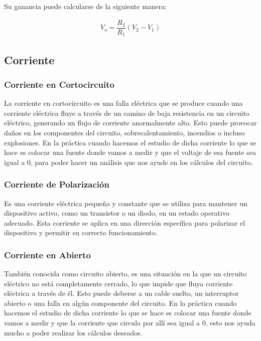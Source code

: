             Su ganancia puede calcularse de la siguiente manera: 

            \begin{gather}
                V_o= \dfrac{R_2}{R_1}(V_2-V_1)
            \end{gather}

    \subsection{Corriente}

        \subsubsection{Corriente en Cortocircuito}

            La corriente en cortocircuito es una falla eléctrica que se produce cuando una corriente eléctrica fluye a través de un camino de baja resistencia en un circuito eléctrico, generando un flujo de corriente anormalmente alto. Esto puede provocar daños en los componentes del circuito, sobrecalentamiento, incendios o incluso explosiones. En la práctica cuando hacemos el estudio de dicha corriente lo que se hace es colocar una fuente donde vamos a medir y que el voltaje de esa fuente sea igual a 0, para poder hacer un análisis que nos ayude en los cálculos del circuito. 

        \subsubsection{Corriente de Polarización}

            Es una corriente eléctrica pequeña y constante que se utiliza para mantener un dispositivo activo, como un transistor o un diodo, en un estado operativo adecuado. Esta corriente se aplica en una dirección específica para polarizar el dispositivo y permitir su correcto funcionamiento.

        \subsubsection{Corriente en Abierto}

            También conocida como circuito abierto, es una situación en la que un circuito eléctrico no está completamente cerrado, lo que impide que fluya corriente eléctrica a través de él. Esto puede deberse a un cable suelto, un interruptor abierto o una falla en algún componente del circuito. En la práctica cuando hacemos el estudio de dicha corriente lo que se hace es colocar una fuente donde vamos a medir y que la corriente que circula por allí sea igual a 0, esto nos ayuda mucho a poder realizar los cálculos deseados. 

